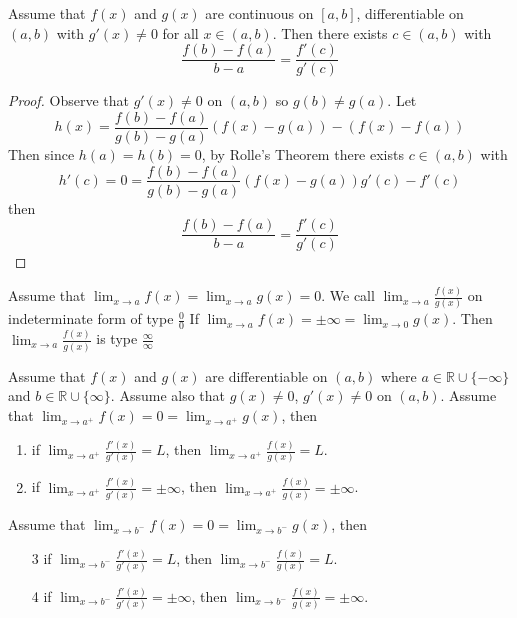 \begin{thm}
Assume that $f(x)$ and $g(x)$ are continuous on $[a,b]$, differentiable on $(a,b)$ with $g'(x) \neq 0$ for all $x\in (a,b)$. Then there exists $c \in (a,b)$ with \[\frac{f(b) - f(a)}{b-a} = \frac{f'(c)}{g'(c)}\]
\end{thm}

\begin{proof}
Observe that $g'(x) \neq 0$ on $(a,b)$ so $g(b)\neq g(a)$. Let \[h(x) = \frac{f(b)-f(a)}{g(b)-g(a)} (f(x)-g(a)) - (f(x) - f(a))\] Then since $h(a) = h(b) = 0$, by Rolle's Theorem there exists $c\in(a,b)$ with \[h'(c) = 0 =  \frac{f(b)-f(a)}{g(b)-g(a)} (f(x)-g(a)) g'(c) - f'(c)\] then \[\frac{f(b) - f(a)}{b-a} = \frac{f'(c)}{g'(c)}\]
\end{proof}

\begin{defn}
Assume that $\lim_{x \to a}f(x) = \lim_{x \to a}g(x) = 0$. We call $\lim_{x\to a}\frac{f(x)}{g(x)}$ on indeterminate form of type $\frac{0}{0}$ If $\lim_{x \to a} f(x) = \pm\infty = \lim_{x \to 0} g(x)$. Then $ \lim_{x \to a}\frac{f(x)}{g(x)}$ is type $\frac{\infty}{\infty}$
\end{defn}


\begin{thm}
Assume that $f(x)$ and $g(x)$ are differentiable on $(a,b)$ where $a \in \mathbb{R} \cup \{-\infty\}$ and $b \in \mathbb{R} \cup \{\infty\}$. Assume also that $g(x)\neq 0$, $g'(x) \neq 0$ on $(a,b)$. Assume that $\lim_{x\to a^+} f(x) = 0 = \lim_{x\to a^+} g(x)$, then \begin{enumerate}
\item if $\displaystyle \lim_{x\to a^+} \frac{f'(x)}{g'(x)} = L$, then $\displaystyle \lim_{x\to a^+} \frac{f(x)}{g(x)} = L$.
\item if $\displaystyle \lim_{x\to a^+} \frac{f'(x)}{g'(x)} = \pm \infty$, then $\displaystyle \lim_{x\to a^+} \frac{f(x)}{g(x)} = \pm\infty$.
\end{enumerate}
Assume that $\lim_{x\to b^-} f(x) = 0 = \lim_{x\to b^-} g(x)$, then \begin{enumerate}
\item[3] if $\displaystyle \lim_{x\to b^-} \frac{f'(x)}{g'(x)} = L$, then $\displaystyle \lim_{x\to b^-} \frac{f(x)}{g(x)} = L$.
\item[4] if $\displaystyle \lim_{x\to b^-} \frac{f'(x)}{g'(x)} = \pm \infty$, then $\displaystyle \lim_{x\to b^-} \frac{f(x)}{g(x)} = \pm\infty$.
\end{enumerate}

\end{thm}


